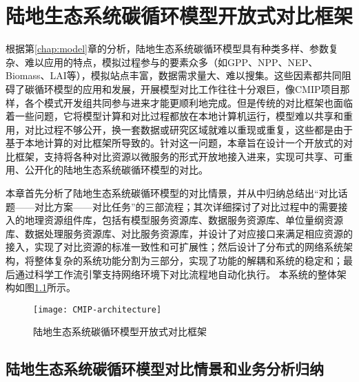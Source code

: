 \chapter{陆地生态系统碳循环模型开放式对比框架}
\label{cha:3}

根据第\ref{chap:model}章的分析，陆地生态系统碳循环模型具有种类多样、参数复杂、难以应用的特点，模拟过程参与的要素众多（如GPP、NPP、NEP、Biomass、LAI等），模拟站点丰富，数据需求量大、难以搜集。这些因素都共同阻碍了碳循环模型的应用和发展，开展模型对比工作往往十分艰巨，像CMIP项目那样，各个模式开发组共同参与进来才能更顺利地完成。但是传统的对比框架也面临着一些问题，它将模型计算和对比过程都放在本地计算机运行，模型难以共享和重用，对比过程不够公开，换一套数据或研究区域就难以重现或重复，这些都是由于基于本地计算的对比框架所导致的。针对这一问题，本章旨在设计一个开放式的对比框架，支持将各种对比资源以微服务的形式开放地接入进来，实现可共享、可重用、公开化的陆地生态系统碳循环模型的对比。

本章首先分析了陆地生态系统碳循环模型的对比情景，并从中归纳总结出“对比话题——对比方案——对比任务”的三部流程；其次详细探讨了对比过程中的需要接入的地理资源组件库，包括有模型服务资源库、数据服务资源库、单位量纲资源库、数据处理服务资源库、对比服务资源库，并设计了对应接口来满足相应资源的接入，实现了对比资源的标准一致性和可扩展性；然后设计了分布式的网络系统架构，将整体复杂的系统功能分割为三部分，实现了功能的解耦和系统的稳定和；最后通过科学工作流引擎支持网络环境下对比流程地自动化执行。
本系统的整体架构如图\ref{fig:CMIP-architecture}所示。

\begin{figure}[!htbp]
    \centering
    \texttt{[image: CMIP-architecture]}
    \caption{陆地生态系统碳循环模型开放式对比框架}
    \label{fig:CMIP-architecture}
\end{figure}

\section{陆地生态系统碳循环模型对比情景和业务分析归纳}
